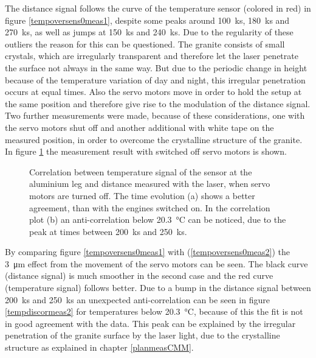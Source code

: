 \documentclass[
a4paper,                                %
twoside,                                %
BCOR1.4cm,                      %
10pt,                           %
headings=normal,                %
headsepline,                    %
clearplainpage, %
final,                                  %
div=14,
parskip=full,
openright,
bibliography=toc
]{scrreprt}
\begin{document}
The distance signal follows the curve of the temperature sensor (colored in red) in figure \ref{tempoversens0meas1}, despite some peaks around \SI{100}{ks}, \SI{180}{ks} and \SI{270}{ks}, as well as jumps at \SI{150}{ks} and \SI{240}{ks}. Due to the regularity of these outliers the reason for this can be questioned. The granite consists of small crystals, which are irregularly transparent and therefore let the laser penetrate the surface not always in the same way. But due to the periodic change in height because of the temperature variation of day and night, this irregular penetration occurs at equal times. Also the servo motors move in order to hold the setup at the same position and therefore give rise to the modulation of the distance signal. Two further measurements were made, because of these considerations, one with the servo motors shut off and another additional with white tape on the measured position, in order to overcome the crystalline structure of the granite. In figure \ref{tempdismeas2} the measurement result with switched off servo motors is shown.

\begin{figure}[H]	
	\centering
	\qquad
	\caption{Correlation between temperature signal of the sensor at the aluminium leg and distance measured with the laser, when servo motors are turned off. The time evolution (a) shows a better agreement, than with the engines switched on. In the correlation plot (b) an anti-correlation below \SI{20.3}{\degreeCelsius} can be noticed, due to the peak at times between \SI{200}{ks} and \SI{250}{ks}.}
	\label{tempdismeas2}
\end{figure}

By comparing figure \ref{tempoversens0meas1} with (\ref{tempoversens0meas2}) the \SI{3}{\micro\m} effect from the movement of the servo motors can be seen. The black curve (distance signal) is much smoother in the second case and the red curve (temperature signal) follows better. Due to a bump in the distance signal between \SI{200}{ks} and \SI{250}{ks} an unexpected anti-correlation can be seen in figure \ref{tempdiscormeas2} for temperatures below \SI{20.3}{\degreeCelsius}, because of this the fit is not in good agreement with the data. This peak can be explained by the irregular penetration of the granite surface by the laser light, due to the crystalline structure as explained in chapter \ref{planmeasCMM}.
\end{document}
